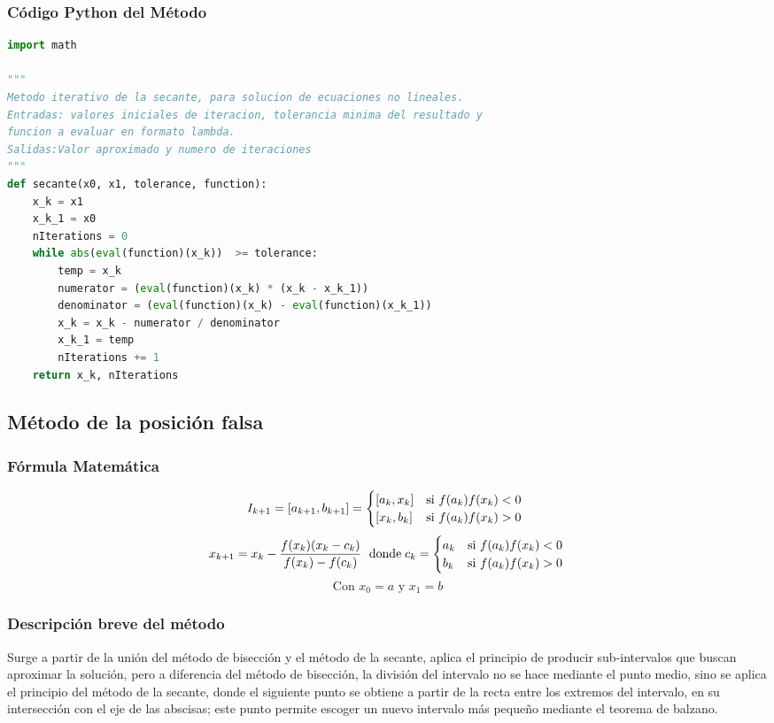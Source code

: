 \documentclass[12pt]{article}
\begin{document}
\subsubsection{Código Python del Método}

\begin{lstlisting}[language=Python, caption=Implementación del método de la secante en python]
import math

"""
Metodo iterativo de la secante, para solucion de ecuaciones no lineales.
Entradas: valores iniciales de iteracion, tolerancia minima del resultado y 
funcion a evaluar en formato lambda.
Salidas:Valor aproximado y numero de iteraciones
"""
def secante(x0, x1, tolerance, function):
    x_k = x1
    x_k_1 = x0
    nIterations = 0
    while abs(eval(function)(x_k))  >= tolerance:
        temp = x_k
        numerator = (eval(function)(x_k) * (x_k - x_k_1))
        denominator = (eval(function)(x_k) - eval(function)(x_k_1))
        x_k = x_k - numerator / denominator
        x_k_1 = temp
        nIterations += 1
    return x_k, nIterations
    \end{lstlisting}

\subsection{Método de la posición falsa}

\subsubsection{Fórmula Matemática}
\[ I_{k+1} = [a_{k+1},b_{k+1}] = \begin{cases} 
      [a_k,x_k] & \text{si } f(a_k)f(x_k) < 0 \\
      [x_k,b_k] & \text{si } f(a_k)f(x_k) > 0 
   \end{cases}\\
   \;
\]
\[ x_{k+1}= x_k -\frac{f(x_k)(x_k-c_k)}{f(x_k)-f(c_k)} \text{ }\; \text{donde}\;
c_k = \begin{cases} 
      a_k & \text{si } f(a_k)f(x_k) < 0 \\
      b_k & \text{si } f(a_k)f(x_k) > 0
   \end{cases}\\
\]
\[ \text{Con } x_0 = a\text{ y } x_1 = b\]

\subsubsection{Descripción breve del método}
Surge a partir de la unión del método de bisección y el método de la secante, aplica el principio de producir sub-intervalos que buscan aproximar la solución, pero a diferencia del método de bisección, la división del intervalo no se hace mediante el punto medio, sino se aplica el principio del método de la secante, donde el siguiente punto se obtiene a partir de la recta entre los extremos del intervalo, en su intersección con el eje de las abscisas; este punto permite escoger un nuevo intervalo más pequeño mediante el teorema de balzano.
\end{document}
